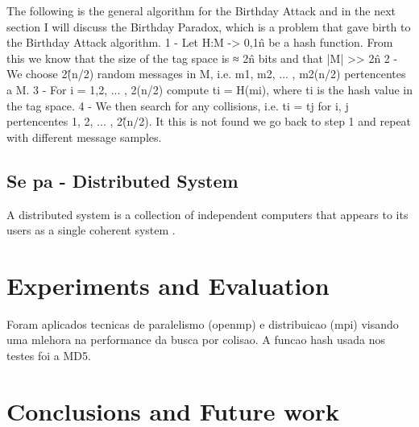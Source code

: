 \documentclass[letterpaper,conference]{IEEEtran}
\begin{document}
The following is the general algorithm for the Birthday Attack and in the next section I will discuss
the Birthday Paradox, which is a problem that gave birth to the Birthday Attack algorithm.
1 - Let H:M -> {0,1}\^n be a hash function. From this we know that the size of the tag space is ≈ 2\^n bits
and that |M| >> 2\^n
2 - We choose 2\^(n/2) random messages in M, i.e. m1, m2, ... , m2(n/2) pertencentes a M.
3 - For i = 1,2, ... , 2(n/2) compute ti = H(mi), where ti is the hash value in the tag space.
4 - We then search for any collisions, i.e. ti = tj for i, j pertencentes {1, 2, ... , 2\^(n/2)}. It this is not
found we go back to step 1 and repeat with different message samples.

\subsection{Se pa - Distributed System}
A distributed system is a collection of independent computers that appears to its users as a single 
coherent system \cite{tanenbaum2002distributed}.
 
\section{Experiments and Evaluation}

Foram aplicados tecnicas de paralelismo (openmp) e distribuicao (mpi) visando uma mlehora na performance
da busca por colisao. A funcao hash usada nos testes foi a MD5.

\section{Conclusions and Future work}



\end{document}
